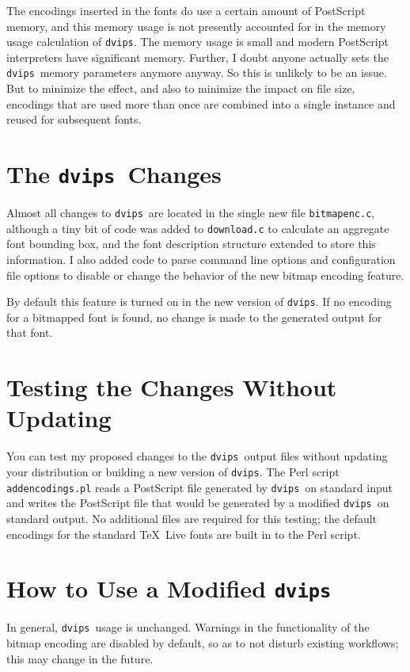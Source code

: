 \documentclass{ltugboat}
\def\dvips{\texttt{dvips}}
\begin{document}
The encodings inserted in the fonts do use a certain amount of
PostScript memory, and this memory usage is not presently
accounted for in the memory usage calculation of \dvips.
The memory usage is small and modern PostScript interpreters
have significant memory. Further, I doubt anyone actually sets
the \dvips\ memory parameters anymore anyway.  So this is unlikely
to be an issue.  But to minimize the effect, and also to
minimize the impact on file size, encodings that are used more
than once are combined into a single instance and reused for
subsequent fonts.

\section{The \dvips\ Changes}

Almost all changes to \dvips\ are located in the single new
file \texttt{bitmapenc.c}, although a tiny bit of code was
added to \texttt{download.c} to calculate an aggregate font
bounding box, and the font description structure extended to
store this information.  I also added code to parse command
line options and configuration file options to disable or
change the behavior of the new bitmap encoding feature.

By default this feature is turned on in the new version of
\dvips.  If no encoding for a bitmapped font is found, no
change is made to the generated output for that font.

\section{Testing the Changes Without Updating}

You can test my proposed changes to the \dvips\ output
files without updating your distribution or building a new
version of \dvips.  The Perl script
\texttt{addencodings.pl} \cite{T3S}
reads a PostScript file generated by \dvips\ on
standard input and writes the PostScript file that would be
generated by a modified \dvips\ on standard output.  No
additional files are required for this testing; the default
encodings for the standard \TeX\ Live fonts are built in to
the Perl script.

\section{How to Use a Modified \dvips}

In general, \dvips\ usage is unchanged.  Warnings in
the functionality of the bitmap encoding are disabled by default,
so as to not disturb existing workflows; this may
change in the future.
\end{document}
